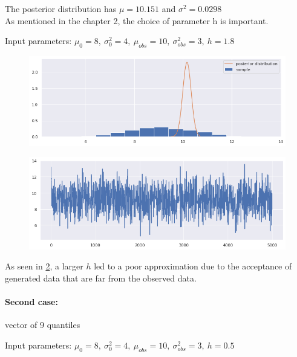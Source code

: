 \documentclass {article}
\begin{document}
The posterior distribution has $\mu=10.151$ and $\sigma^2=0.0298$ \\

As mentioned in the chapter 2, the choice of parameter h is important.  \\
\begin{center} Input parameters: $\mu_{0}=8,\  \sigma_{0}^2=4,\  \mu_{obs}=10,\  \sigma_{obs}^2 =3,\ h=1.8$  \end{center}


\begin{figure}[h!]
	\centering
	\includegraphics[width=\textwidth]{immagini_abc/h1.8}	
	\caption{}
	\label{abch18}
\end{figure}
\begin{figure}[h!]
	\centering
	\includegraphics[width=\textwidth]{immagini_abc/sample1.8}	
	\caption{}
	\label{abch18}
\end{figure}


As seen in \ref{abch18}, a larger $h$ led to a poor approximation due to the acceptance of generated data that are far from the observed data.

\paragraph{Second case:} vector of 9 quantiles 
\begin{center} Input parameters: $\mu_{0}=8,\  \sigma_{0}^2=4,\  \mu_{obs}=10,\  \sigma_{obs}^2 =3,\ h=0.5$  \end{center}
\end{document}
